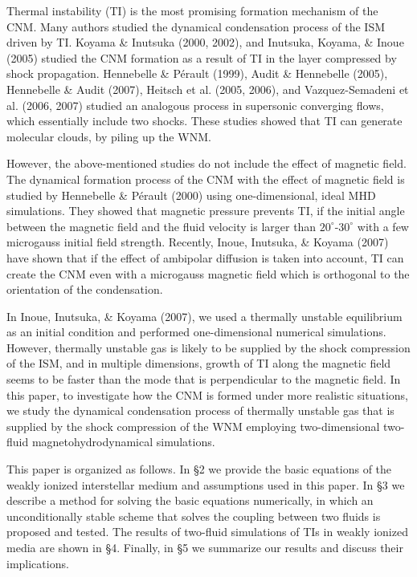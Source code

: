 \documentclass[12pt,preprint]{aastex}
\begin{document}
Thermal instability (TI) is the most promising formation mechanism of the CNM.
Many authors studied the dynamical condensation process of the ISM driven by TI.
Koyama \& Inutsuka (2000, 2002), and Inutsuka, Koyama, \& Inoue (2005) studied the CNM formation as a result of TI in the layer compressed by shock propagation.
Hennebelle \& P\'erault (1999), Audit \& Hennebelle (2005), Hennebelle \& Audit (2007), Heitsch et al. (2005, 2006), and Vazquez-Semadeni et al. (2006, 2007) studied an analogous process in supersonic converging flows, which essentially include two shocks.
These studies showed that TI can generate molecular clouds, by piling up the WNM.

However, the above-mentioned studies do not include the effect of magnetic field.
The dynamical formation process of the CNM with the effect of magnetic field is studied by Hennebelle \& P\'erault (2000) using one-dimensional, ideal MHD simulations.
They showed that magnetic pressure prevents TI, if the initial angle between the magnetic field and the fluid velocity is larger than $20^\circ$-$30^\circ$ with a few microgauss initial field strength.
Recently, Inoue, Inutsuka, \& Koyama (2007) have shown that if the effect of ambipolar diffusion is taken into account, TI can create the CNM even with a microgauss magnetic field which is orthogonal to the orientation of the condensation.

In Inoue, Inutsuka, \& Koyama (2007), we used a thermally unstable equilibrium as an initial condition and performed one-dimensional numerical simulations.
However, thermally unstable gas is likely to be supplied by the shock compression of the ISM, and in multiple dimensions, growth of TI along the magnetic field seems to be faster than the mode that is perpendicular to the magnetic field.
In this paper, to investigate how the CNM is formed under more realistic situations, we study the dynamical condensation process of thermally unstable gas that is supplied by the shock compression of the WNM employing two-dimensional two-fluid magnetohydrodynamical simulations.

This paper is organized as follows.
In \S 2 we provide the basic equations of the weakly ionized interstellar medium and assumptions used in this paper.
In \S 3 we describe a method for solving the basic equations numerically, in which an unconditionally stable scheme that solves the coupling between two fluids is proposed and tested.
The results of two-fluid simulations of TIs in weakly ionized media are shown in \S 4.
Finally, in \S 5 we summarize our results and discuss their implications. 
\end{document}
